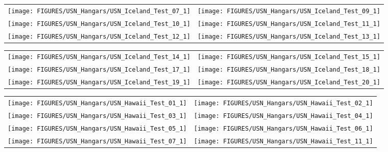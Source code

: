 \newpage

\begin{figure}[p]
\begin{tabular*}{\textwidth}{l@{\extracolsep{\fill}}r}
\texttt{[image: FIGURES/USN\_Hangars/USN\_Iceland\_Test\_07\_1]} &
\texttt{[image: FIGURES/USN\_Hangars/USN\_Iceland\_Test\_09\_1]} \\
\texttt{[image: FIGURES/USN\_Hangars/USN\_Iceland\_Test\_10\_1]} &
\texttt{[image: FIGURES/USN\_Hangars/USN\_Iceland\_Test\_11\_1]} \\
\texttt{[image: FIGURES/USN\_Hangars/USN\_Iceland\_Test\_12\_1]} &
\texttt{[image: FIGURES/USN\_Hangars/USN\_Iceland\_Test\_13\_1]} \\
\end{tabular*}
\label{USN_Plume_Iceland_2}
\end{figure}

\begin{figure}[p]
\begin{tabular*}{\textwidth}{l@{\extracolsep{\fill}}r}
\texttt{[image: FIGURES/USN\_Hangars/USN\_Iceland\_Test\_14\_1]} &
\texttt{[image: FIGURES/USN\_Hangars/USN\_Iceland\_Test\_15\_1]} \\
\texttt{[image: FIGURES/USN\_Hangars/USN\_Iceland\_Test\_17\_1]} &
\texttt{[image: FIGURES/USN\_Hangars/USN\_Iceland\_Test\_18\_1]} \\
\texttt{[image: FIGURES/USN\_Hangars/USN\_Iceland\_Test\_19\_1]} &
\texttt{[image: FIGURES/USN\_Hangars/USN\_Iceland\_Test\_20\_1]} \\
\end{tabular*}
\label{USN_Plume_Iceland_3}
\end{figure}

\begin{figure}[p]
\begin{tabular*}{\textwidth}{l@{\extracolsep{\fill}}r}
\texttt{[image: FIGURES/USN\_Hangars/USN\_Hawaii\_Test\_01\_1]} &
\texttt{[image: FIGURES/USN\_Hangars/USN\_Hawaii\_Test\_02\_1]} \\
\texttt{[image: FIGURES/USN\_Hangars/USN\_Hawaii\_Test\_03\_1]} &
\texttt{[image: FIGURES/USN\_Hangars/USN\_Hawaii\_Test\_04\_1]} \\
\texttt{[image: FIGURES/USN\_Hangars/USN\_Hawaii\_Test\_05\_1]} &
\texttt{[image: FIGURES/USN\_Hangars/USN\_Hawaii\_Test\_06\_1]} \\
\texttt{[image: FIGURES/USN\_Hangars/USN\_Hawaii\_Test\_07\_1]} &
\texttt{[image: FIGURES/USN\_Hangars/USN\_Hawaii\_Test\_11\_1]}
\end{tabular*}
\label{USN_Plume_Hawaii}
\end{figure}

